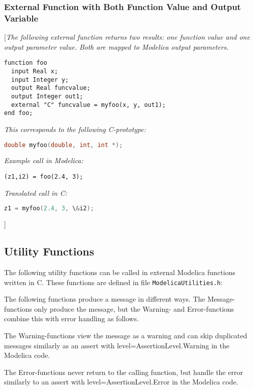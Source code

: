 \subsubsection{External Function with Both Function Value and Output Variable}

{[}\emph{The following external function returns two results: one
function value and one output parameter value. Both are mapped to
Modelica output parameters.}

\begin{lstlisting}[language=modelica]
function foo
  input Real x;
  input Integer y;
  output Real funcvalue;
  output Integer out1;
  external "C" funcvalue = myfoo(x, y, out1);
end foo;
\end{lstlisting}
\emph{This corresponds to the following C-prototype:}
\begin{lstlisting}[language=C]
double myfoo(double, int, int *);
\end{lstlisting}
\emph{Example call in Modelica: }
\begin{lstlisting}[language=modelica]
(z1,i2) = foo(2.4, 3);
\end{lstlisting}
\emph{Translated call in C:}
\begin{lstlisting}[language=C]
z1 = myfoo(2.4, 3, \&i2);
\end{lstlisting}
{]}

\subsection{Utility Functions}

The following utility functions can be called in external Modelica
functions written in C. These functions are defined in file
\lstinline!ModelicaUtilities.h!:

The following functions produce a message in different ways. The
Message-functions only produce the message, but the Warning- and
Error-functions combine this with error handling as follows.

The Warning-functions view the message as a warning and can skip
duplicated messages similarly as an assert with
level=AssertionLevel.Warning in the Modelica code.

The Error-functions never return to the calling function, but handle the
error similarly to an assert with level=AssertionLevel.Error in the
Modelica code.

